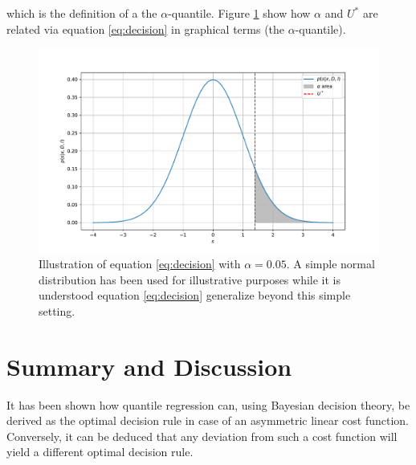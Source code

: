 \documentclass[a4paper,11pt, oneside]{article}
\theoremstyle{definition}
\begin{document}
	which is the definition of a the $\alpha$-quantile. Figure \ref{fig:2} show how $\alpha$ and $U^*$ are related via equation \eqref{eq:decision} in graphical terms (the $\alpha$-quantile).
	\begin{figure}[H]
		\centering
		\includegraphics[width = 1\textwidth]{figures/alpha_plot.pdf}
		\caption{Illustration of equation \eqref{eq:decision} with $\alpha = 0.05$. A simple normal distribution has been used for illustrative purposes while it is understood equation \eqref{eq:decision} generalize beyond this simple setting.}
		\label{fig:2}
	\end{figure}
	
	
	\section{Summary and Discussion}	
	It has been shown how quantile regression can, using Bayesian decision theory, be derived as the optimal decision rule in case of an asymmetric linear cost function. Conversely, it can be deduced that any deviation from such a cost function will yield a different optimal decision rule.
	
	
	
	
	
\end{document}
